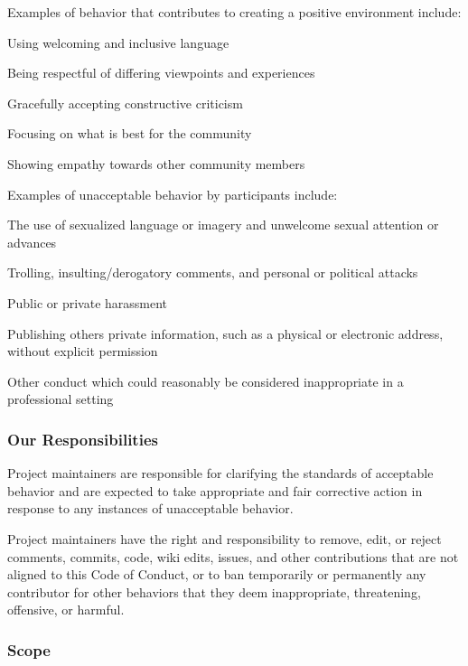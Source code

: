 Examples of behavior that contributes to creating a positive environment include\+:


\begin{DoxyItemize}
\item Using welcoming and inclusive language
\item Being respectful of differing viewpoints and experiences
\item Gracefully accepting constructive criticism
\item Focusing on what is best for the community
\item Showing empathy towards other community members
\end{DoxyItemize}

Examples of unacceptable behavior by participants include\+:


\begin{DoxyItemize}
\item The use of sexualized language or imagery and unwelcome sexual attention or advances
\item Trolling, insulting/derogatory comments, and personal or political attacks
\item Public or private harassment
\item Publishing others\textquotesingle{} private information, such as a physical or electronic address, without explicit permission
\item Other conduct which could reasonably be considered inappropriate in a professional setting
\end{DoxyItemize}

\subsubsection*{Our Responsibilities}

Project maintainers are responsible for clarifying the standards of acceptable behavior and are expected to take appropriate and fair corrective action in response to any instances of unacceptable behavior.

Project maintainers have the right and responsibility to remove, edit, or reject comments, commits, code, wiki edits, issues, and other contributions that are not aligned to this Code of Conduct, or to ban temporarily or permanently any contributor for other behaviors that they deem inappropriate, threatening, offensive, or harmful.

\subsubsection*{Scope}

